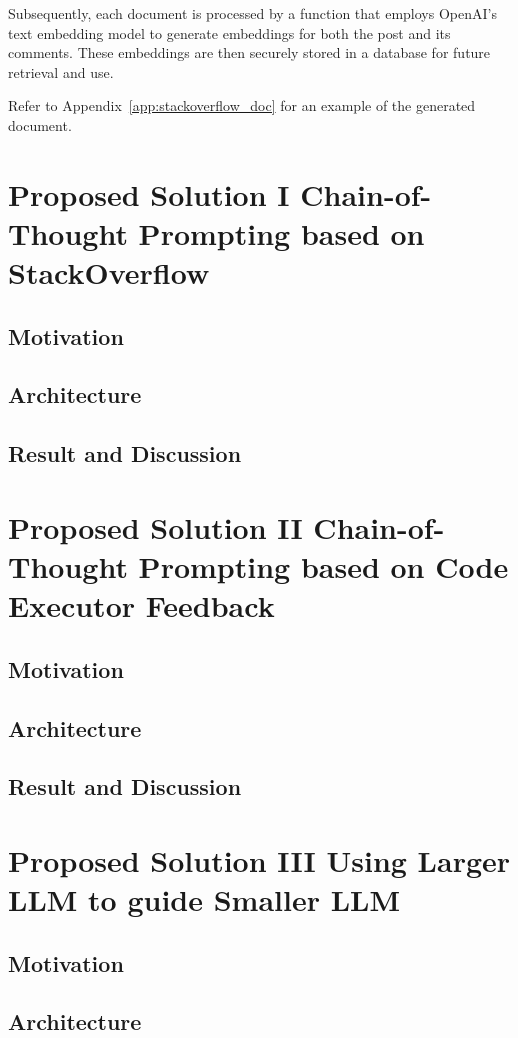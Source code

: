\documentclass[a4paper,oneside]{book}
\begin{document}
Subsequently, each document is processed by a function that employs OpenAI's text embedding model to generate embeddings for both the post and its comments. These embeddings are then securely stored in a database for future retrieval and use.

Refer to Appendix~\ref{app:stackoverflow_doc} for an example of the generated document.

\section{Proposed Solution I\: Chain-of-Thought Prompting based on StackOverflow}
\subsection{Motivation}
\subsection{Architecture}
\subsection{Result and Discussion}
\section{Proposed Solution II\: Chain-of-Thought Prompting based on Code Executor Feedback}
\subsection{Motivation}
\subsection{Architecture}
\subsection{Result and Discussion}
\section{Proposed Solution III\: Using Larger LLM to guide Smaller LLM}
\subsection{Motivation}
\subsection{Architecture}
\end{document}
